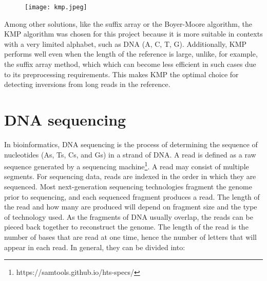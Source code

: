 \begin{figure}[h]

  \centering
    \texttt{[image: kmp.jpeg]}
  \label{fig:kmp}
\end{figure}

Among other solutions, like the suffix array or the Boyer-Moore algorithm, the KMP algorithm was chosen for this project because it is more suitable in contexts with a very limited alphabet, such as DNA ({A, C, T, G}). Additionally, KMP performs well even when the length of the reference is large, unlike, for example, the suffix array method, which which can become less efficient in such cases due to its preprocessing requirements. This makes KMP the optimal choice for detecting inversions from long reads in the reference. 

\section{DNA sequencing}

In bioinformatics, DNA sequencing is the process of determining the sequence of nucleotides (As, Ts, Cs, and Gs) in a strand of DNA. A read is defined as a raw sequence generated by a sequencing machine\footnote{https://samtools.github.io/hts-specs/}. A read may consist of multiple segments. For sequencing data, reads are indexed in the order in which they are sequenced. Most next-generation sequencing technologies fragment the genome prior to sequencing, and each sequenced fragment produces a read. The length of the read and how many are produced will depend on fragment size and the type of technology used. As the fragments of DNA usually overlap, the reads can be pieced back together to reconstruct the genome. The length of the read is the number of bases that are read at one time, hence the number of letters that will appear in each read. In general, they can be divided into:

